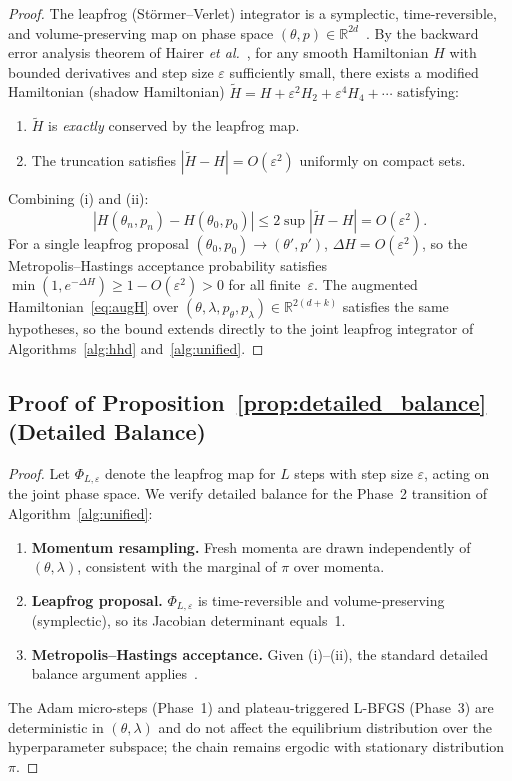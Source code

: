 \documentclass[11pt]{article}
\theoremstyle{definition}
\newcommand{\tHH}{\widetilde{H}}
\begin{document}
\begin{proof}
The leapfrog (St\"{o}rmer--Verlet) integrator is a symplectic,
time-reversible, and volume-preserving map on phase space
$(\theta,p)\in\mathbb{R}^{2d}$~\cite[Ch.~VI]{hairer2006}.
By the backward error analysis theorem of Hairer \emph{et
al.}~\cite[Thm.~IX.3.1]{hairer2006}, for any smooth Hamiltonian
$H$ with bounded derivatives and step size $\varepsilon$ sufficiently
small, there exists a modified Hamiltonian (shadow Hamiltonian)
$\tHH = H + \varepsilon^2 H_2 + \varepsilon^4 H_4 + \cdots$ satisfying:
\begin{enumerate}[label=(\roman*)]
  \item $\tHH$ is \emph{exactly} conserved by the leapfrog map.
  \item The truncation satisfies
        $|\tHH - H| = O(\varepsilon^2)$ uniformly on compact sets.
\end{enumerate}
Combining (i) and (ii):
\[
  |H(\theta_n,p_n) - H(\theta_0,p_0)|
  \le 2\sup|\tHH - H| = O(\varepsilon^2).
\]
For a single leapfrog proposal $(\theta_0,p_0) \to (\theta',p')$,
$\Delta H = O(\varepsilon^2)$, so the Metropolis--Hastings
acceptance probability satisfies
$\min(1,e^{-\Delta H}) \ge 1 - O(\varepsilon^2) > 0$
for all finite~$\varepsilon$.
The augmented Hamiltonian~\eqref{eq:augH} over
$(\theta,\lambda,p_\theta,p_\lambda)\in\mathbb{R}^{2(d+k)}$ satisfies
the same hypotheses, so the bound extends directly to the joint
leapfrog integrator of Algorithms~\ref{alg:hhd} and~\ref{alg:unified}.
\end{proof}

\subsection{Proof of Proposition~\ref{prop:detailed_balance} (Detailed Balance)}

\begin{proof}
Let $\Phi_{L,\varepsilon}$ denote the leapfrog map for $L$ steps with
step size $\varepsilon$, acting on the joint phase space.
We verify detailed balance for the Phase~2 transition of
Algorithm~\ref{alg:unified}:
\begin{enumerate}[label=(\roman*)]
  \item \textbf{Momentum resampling.} Fresh momenta are drawn
        independently of $(\theta,\lambda)$, consistent with the
        marginal of $\pi$ over momenta.

  \item \textbf{Leapfrog proposal.} $\Phi_{L,\varepsilon}$ is
        time-reversible and volume-preserving (symplectic), so its
        Jacobian determinant equals~1.

  \item \textbf{Metropolis--Hastings acceptance.} Given (i)--(ii),
        the standard detailed balance argument applies~\cite[Prop.~5.2]{neal2011}.
\end{enumerate}
The Adam micro-steps (Phase~1) and plateau-triggered L-BFGS
(Phase~3) are deterministic in $(\theta,\lambda)$ and do not affect
the equilibrium distribution over the hyperparameter subspace; the
chain remains ergodic with stationary distribution~$\pi$.
\end{proof}
\end{document}
